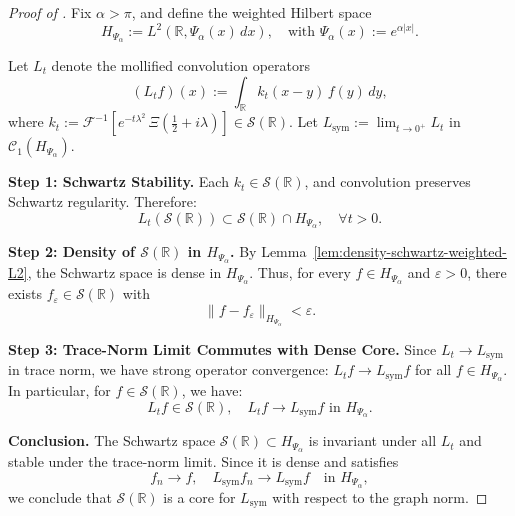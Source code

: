 \begin{proof}[Proof of ]
Fix \( \alpha > \pi \), and define the weighted Hilbert space
\[
H_{\Psi_\alpha} := L^2(\mathbb{R}, \Psi_\alpha(x)\, dx), \quad \text{with } \Psi_\alpha(x) := e^{\alpha |x|}.
\]

Let \( L_t \) denote the mollified convolution operators
\[
(L_t f)(x) := \int_{\mathbb{R}} k_t(x - y)\, f(y)\, dy,
\]
where \( k_t := \mathscr{F}^{-1}\left[ e^{-t\lambda^2} \, \Xi\left(\tfrac{1}{2} + i\lambda \right) \right] \in \mathcal{S}(\mathbb{R}) \). Let \( L_{\mathrm{sym}} := \lim_{t \to 0^+} L_t \) in \( \mathcal{C}_1(H_{\Psi_\alpha}) \).

\medskip
\noindent\textbf{Step 1: Schwartz Stability.}
Each \( k_t \in \mathcal{S}(\mathbb{R}) \), and convolution preserves Schwartz regularity. Therefore:
\[
L_t(\mathcal{S}(\mathbb{R})) \subset \mathcal{S}(\mathbb{R}) \cap H_{\Psi_\alpha}, \quad \forall t > 0.
\]

\medskip
\noindent\textbf{Step 2: Density of \( \mathcal{S}(\mathbb{R}) \) in \( H_{\Psi_\alpha} \).}
By Lemma~\ref{lem:density-schwartz-weighted-L2}, the Schwartz space is dense in \( H_{\Psi_\alpha} \). Thus, for every \( f \in H_{\Psi_\alpha} \) and \( \varepsilon > 0 \), there exists \( f_\varepsilon \in \mathcal{S}(\mathbb{R}) \) with
\[
\|f - f_\varepsilon\|_{H_{\Psi_\alpha}} < \varepsilon.
\]

\medskip
\noindent\textbf{Step 3: Trace-Norm Limit Commutes with Dense Core.}
Since \( L_t \to L_{\mathrm{sym}} \) in trace norm, we have strong operator convergence: \( L_t f \to L_{\mathrm{sym}} f \) for all \( f \in H_{\Psi_\alpha} \). In particular, for \( f \in \mathcal{S}(\mathbb{R}) \), we have:
\[
L_t f \in \mathcal{S}(\mathbb{R}), \quad L_t f \to L_{\mathrm{sym}} f \text{ in } H_{\Psi_\alpha}.
\]

\medskip
\noindent\textbf{Conclusion.}
The Schwartz space \( \mathcal{S}(\mathbb{R}) \subset H_{\Psi_\alpha} \) is invariant under all \( L_t \) and stable under the trace-norm limit. Since it is dense and satisfies
\[
f_n \to f, \quad L_{\mathrm{sym}} f_n \to L_{\mathrm{sym}} f \quad \text{in } H_{\Psi_\alpha},
\]
we conclude that \( \mathcal{S}(\mathbb{R}) \) is a core for \( L_{\mathrm{sym}} \) with respect to the graph norm.
\end{proof}
